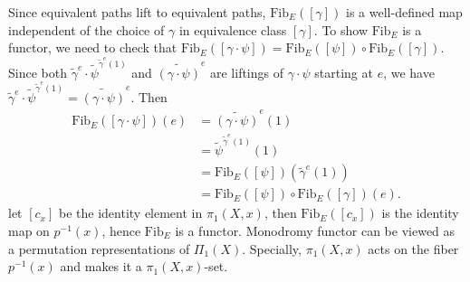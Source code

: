 \documentclass{report}
\begin{document}
\pf
{
	Since equivalent paths lift to equivalent paths, $\mathrm{Fib}_E([\gamma])$ is a well-defined map independent of the choice of $\gamma$ in equivalence class $[\gamma]$. To show $\mathrm{Fib}_E$ is a functor, we need to check that $\mathrm{Fib}_E([\gamma\cdot\psi])=\mathrm{Fib}_E([\psi])\circ\mathrm{Fib}_E([\gamma])$. Since both $\widetilde{\gamma}^e\cdot\widetilde{\psi}^{\widetilde{\gamma}^e(1)}$ and $\widetilde{(\gamma\cdot\psi)}^e$ are liftings of $\gamma\cdot\psi$ starting at $e$, we have $\widetilde{\gamma}^e\cdot\widetilde{\psi}^{\widetilde{\gamma}^e(1)}=\widetilde{(\gamma\cdot\psi)}^e$. Then
	\begin{align*}
		\mathrm{Fib}_E([\gamma\cdot\psi])(e)&=\widetilde{(\gamma\cdot\psi)}^e(1)\\
		&=\widetilde{\psi}^{\widetilde{\gamma}^e(1)}(1)\\
		&=\mathrm{Fib}_E([\psi])(\widetilde{\gamma}^e(1))\\
		&=\mathrm{Fib}_E([\psi])\circ\mathrm{Fib}_E([\gamma])(e).
	\end{align*}
	let $[c_x]$ be the identity element in $\pi_1(X,x)$, then $\mathrm{Fib}_E([c_x])$ is the identity map on $p^{-1}(x)$, hence $\mathrm{Fib}_E$ is a functor.
}
Monodromy functor can be viewed as a permutation representations of $\Pi_1(X)$. Specially, $\pi_1(X, x)$ acts on the fiber $p^{-1}(x)$ and makes it a $\pi_1(X, x)$-set. 

\end{document}
